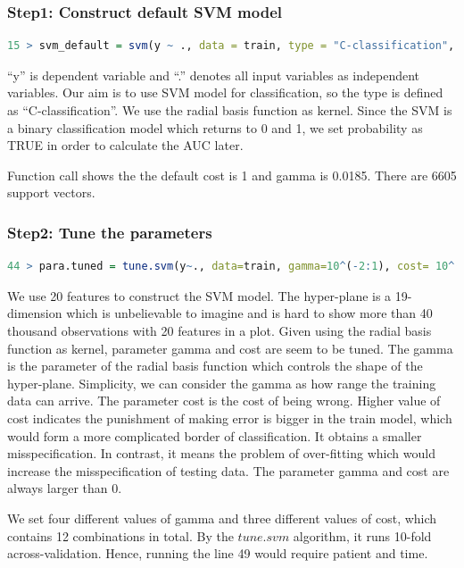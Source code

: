 \documentclass[12pt, a4paper, bibliography=totoc, english]{scrartcl}
\begin{document}
\subsubsection{Step1: Construct default SVM model}
\begin{lstlisting}[language = R]
15 > svm_default = svm(y ~ ., data = train, type = "C-classification", kernel = "radial", probability = TRUE)
\end{lstlisting}

``y'' is dependent variable and ``.'' denotes all input variables as independent variables. Our aim is to use SVM model for classification, so the type is defined as ``C-classification''. We use the radial basis function as kernel. Since the SVM is a binary classification model which returns to 0 and 1, we set probability as TRUE in order to calculate the AUC later. 

Function call shows the the default cost is 1 and gamma is 0.0185. There are 6605 support vectors. \\
\subsubsection{Step2: Tune the parameters}
\begin{lstlisting}[language = R]
44 > para.tuned = tune.svm(y~., data=train, gamma=10^(-2:1), cost= 10^(-1:1))
\end{lstlisting}

We use 20 features to construct the SVM model. The hyper-plane is a 19-dimension which is unbelievable to imagine and is hard to show more than 40 thousand observations with 20 features in a plot. Given using the radial basis function as kernel, parameter gamma and cost are seem to be tuned. The gamma is the parameter of the radial basis function which controls the shape of the hyper-plane. Simplicity, we can consider the gamma as how range the training data can arrive. The parameter cost is the cost of being wrong. Higher value of cost indicates the punishment of making error is bigger in the train model, which would form a more complicated border of classification. It obtains a smaller misspecification. In contrast, it means the problem of over-fitting which would increase the misspecification of testing data. The parameter gamma and cost are always larger than 0. 

We set four different values of gamma and three different values of cost, which contains 12 combinations in total. By the $tune.svm$ algorithm, it runs 10-fold across-validation. Hence, running the line 49 would require patient and time. 
\end{document}

